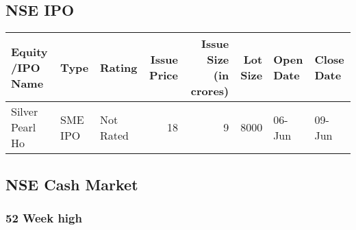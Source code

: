 \documentclass[
]{article}
\begin{document}
\hypertarget{nse-ipo}{%
\subsection{NSE IPO}\label{nse-ipo}}

\begin{table}
\centering\begingroup\fontsize{12}{14}\selectfont

\begin{tabular}{l|l|l|r|r|r|l|l}
\hline
Equity /IPO Name & Type & Rating & Issue Price & Issue Size (in crores) & Lot Size & Open Date & Close Date\\
\hline
Silver Pearl Ho & SME IPO & Not Rated & 18 & 9 & 8000 & 06-Jun & 09-Jun\\
\hline
\end{tabular}
\endgroup{}
\end{table}

\hypertarget{nse-cash-market}{%
\subsection{NSE Cash Market}\label{nse-cash-market}}

\hypertarget{week-high}{%
\subsubsection{52 Week high}\label{week-high}}
\end{document}
